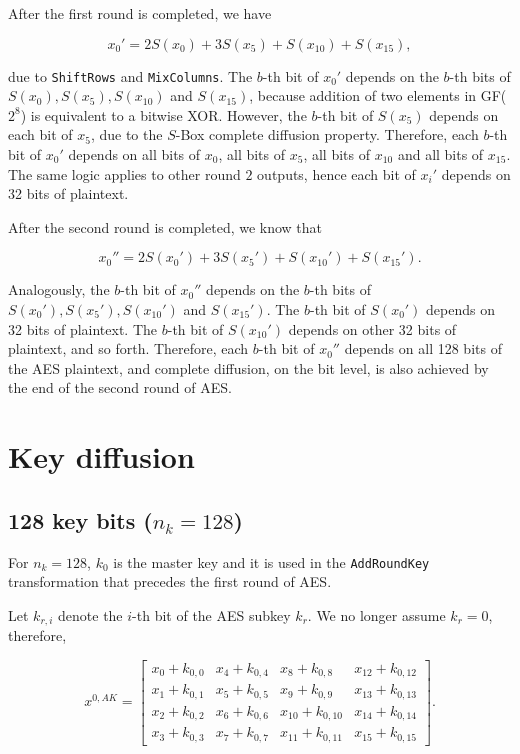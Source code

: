 \documentclass{report}
\begin{document}
After the first round is completed, we have 

$$x_0' = 2S(x_0) + 3S(x_5) + S(x_{10}) + S(x_{15}),$$ 

due to \texttt{ShiftRows} and \texttt{MixColumns}. The $b$-th bit of $x_0'$ depends on the $b$-th bits of $S(x_0), S(x_5), S(x_{10})$ and $S(x_{15})$, because addition of two elements in GF($2^8$) is equivalent to a  bitwise XOR. However, the $b$-th bit of $S(x_5)$ depends on each bit of $x_5$, due to the $S$-Box complete diffusion property. Therefore, each $b$-th bit of $x_0'$ depends on all bits of $x_0$, all bits of $x_5$, all bits of $x_{10}$ and all bits of $x_{15}$. The same logic applies to other round $2$ outputs, hence each bit of $x_i'$ depends on 32 bits of plaintext.

After the second round is completed, we know that 

$$x_0'' = 2S(x_0') + 3S(x_5') + S(x_{10}') + S(x_{15}').$$

Analogously, the $b$-th bit of $x_0''$ depends on the $b$-th bits of $S(x_0'), S(x_5'), S(x_{10}')$ and $S(x_{15}')$. The $b$-th bit of $S(x_0')$ depends on 32 bits of plaintext. The $b$-th bit of $S(x_{10}')$ depends on other 32 bits of plaintext, and so forth. Therefore, each $b$-th bit of $x_0''$ depends on all 128 bits of the AES plaintext, and complete diffusion, on the bit level, is also achieved by the end of the second round of AES.

\section{Key diffusion}
\subsection{128 key bits ($n_k = 128$)}
For $n_k = 128$, $k_0$ is the master key and it is used in the \texttt{AddRoundKey} transformation that precedes the first round of AES.

Let $k_{r,i}$ denote the $i$-th bit of the AES subkey $k_r$. We no longer assume $k_r = 0$, therefore,

\begin{equation}\label{mat:aes-plaintext}
x^{0,AK} =
\begin{bmatrix}
x_0 + k_{0, 0} & x_4 + k_{0, 4} & x_8 + k_{0, 8} & x_{12} + k_{0, 12}\\
x_1 + k_{0, 1} & x_5 + k_{0, 5} & x_9 + k_{0, 9} & x_{13} + k_{0, 13}\\
x_2 + k_{0, 2} & x_6 + k_{0, 6} & x_{10} + k_{0, 10} & x_{14} + k_{0, 14}\\
x_3 + k_{0, 3} & x_7 + k_{0, 7} & x_{11} + k_{0, 11} & x_{15} + k_{0, 15}
\end{bmatrix}.
\end{equation}
\end{document}
